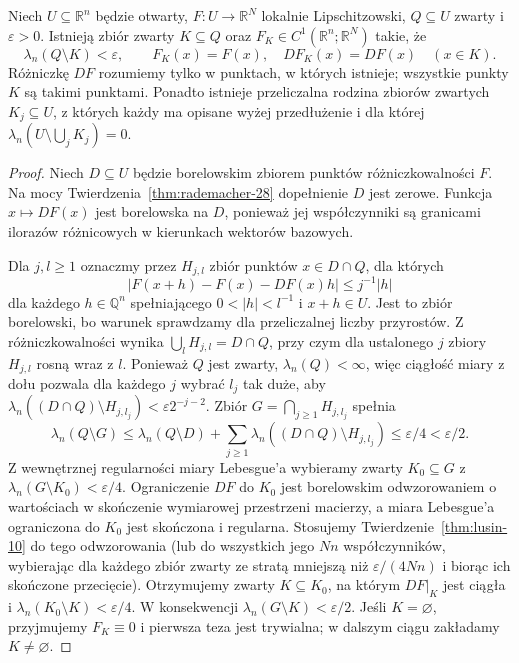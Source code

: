 \begin{lemat}
\label{lem:lusin-whitney-28}
Niech $U\subseteq\mathbb R^n$ będzie otwarty,
$F:U\to\mathbb R^N$ lokalnie Lipschitzowski,
$Q\subseteq U$ zwarty i $\varepsilon>0$.
Istnieją zbiór zwarty $K\subseteq Q$ oraz
$F_K\in C^1(\mathbb R^n;\mathbb R^N)$ takie, że
\[
 \lambda_n(Q\setminus K)<\varepsilon,\qquad
 F_K(x)=F(x),\quad DF_K(x)=DF(x)\quad(x\in K).
\]
Różniczkę $DF$ rozumiemy tylko w punktach,
w których istnieje; wszystkie punkty $K$ są
takimi punktami. Ponadto istnieje przeliczalna rodzina zbiorów zwartych
$K_j\subseteq U$, z których każdy ma opisane wyżej
przedłużenie i dla której
$\lambda_n(U\setminus\bigcup_jK_j)=0$.
\end{lemat}
\begin{proof}
Niech $D\subseteq U$ będzie borelowskim zbiorem
punktów różniczkowalności $F$. Na mocy
Twierdzenia~\ref{thm:rademacher-28} dopełnienie
$D$ jest zerowe. Funkcja $x\mapsto DF(x)$ jest
borelowska na $D$, ponieważ jej współczynniki
są granicami ilorazów różnicowych w kierunkach
wektorów bazowych.

Dla $j,l\ge1$ oznaczmy przez $H_{j,l}$ zbiór
punktów $x\in D\cap Q$, dla których
\[
 |F(x+h)-F(x)-DF(x)h|\le j^{-1}|h|
\]
dla każdego $h\in\mathbb Q^n$ spełniającego
$0<|h|<l^{-1}$ i $x+h\in U$. Jest to zbiór
borelowski, bo warunek sprawdzamy dla
przeliczalnej liczby przyrostów. Z różniczkowalności wynika
$\bigcup_lH_{j,l}=D\cap Q$, przy czym dla ustalonego
$j$ zbiory $H_{j,l}$ rosną wraz z $l$.
Ponieważ $Q$ jest zwarty, $\lambda_n(Q)<\infty$,
więc ciągłość miary z dołu pozwala dla każdego $j$
wybrać $l_j$ tak duże,
aby $\lambda_n((D\cap Q)\setminus H_{j,l_j})
<\varepsilon2^{-j-2}$. Zbiór
$G=\bigcap_{j\ge1}H_{j,l_j}$ spełnia
\[
 \lambda_n(Q\setminus G)
 \le\lambda_n(Q\setminus D)
 +\sum_{j\ge1}\lambda_n((D\cap Q)\setminus H_{j,l_j})
 \le\varepsilon/4<\varepsilon/2.
\]
Z wewnętrznej regularności miary Lebesgue'a
wybieramy zwarty $K_0\subseteq G$ z
$\lambda_n(G\setminus K_0)<\varepsilon/4$.
Ograniczenie $DF$ do $K_0$ jest borelowskim
odwzorowaniem o wartościach w skończenie wymiarowej
przestrzeni macierzy, a miara Lebesgue'a ograniczona
do $K_0$ jest skończona i regularna. Stosujemy Twierdzenie~\ref{thm:lusin-10}
do tego odwzorowania (lub do wszystkich jego
$Nn$ współczynników, wybierając dla każdego zbiór zwarty
ze stratą mniejszą niż $\varepsilon/(4Nn)$ i biorąc
ich skończone przecięcie). Otrzymujemy zwarty
$K\subseteq K_0$, na którym $DF|_K$ jest ciągła
i $\lambda_n(K_0\setminus K)<\varepsilon/4$.
W konsekwencji $\lambda_n(G\setminus K)<\varepsilon/2$. Jeśli $K=\varnothing$,
przyjmujemy $F_K\equiv0$ i pierwsza teza jest
trywialna; w dalszym ciągu zakładamy $K\ne\varnothing$.


\end{proof}
